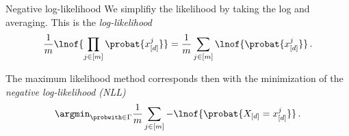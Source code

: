 \documentclass{beamer}
\begin{document}
    \begin{frame}{Negative log-likelihood}
        We simplifiy the likelihood by taking the log and averaging.
        This is the \emph{log-likelihood}
        \begin{align*}
            \frac{1}{\datdim} \lnof{\prod_{\datindexin} \probat{\shortcatindices^{\datindex}}}
            = \frac{1}{\datdim} \sum_{\datindexin} \lnof{\probat{\shortcatindices^{\datindex}}} \, .
        \end{align*}

        The maximum likelihood method corresponds then with the minimization of the \emph{negative log-likelihood (NLL)}
        \begin{align*}
            \argmin_{\probwith\in\Gamma}\frac{1}{\datdim}\sum_{\datindexin}
            -\lnof{\probat{\shortcatvariables=\shortcatindices^{\datindex}}} \, .
        \end{align*}

    \end{frame}
\end{document}
